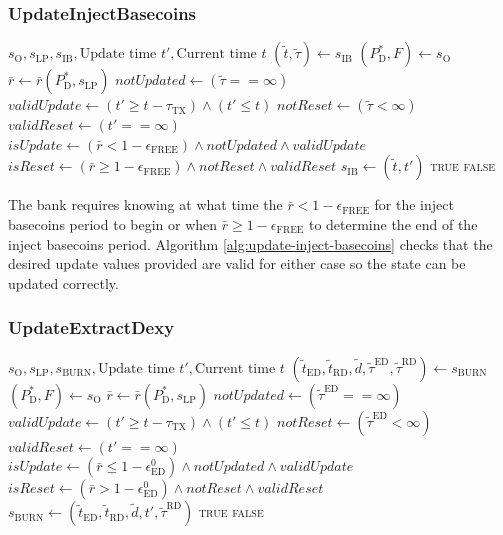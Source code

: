 \documentclass{ifcolog}
\newcommand{\Pdt}{P_{\mathrm{D}}^{*}}
\newcommand{\rr}{\bar{r}}
\newcommand{\slp}{s_{\mathrm{LP}}}
\newcommand{\soracle}{s_{\textrm{O}}}
\newcommand{\sib}{s_{\textrm{IB}}}
\newcommand{\sburn}{s_{\textrm{BURN}}}
\newcommand{\tautx}{\tau_{\textrm{TX}}}
\newcommand{\epsilonfree}{\epsilon_{\textrm{FREE}}}
\newcommand{\epsilondexyzero}{\epsilon_{\textrm{ED}}^{0}}
\begin{document}
\newpage

\subsubsection{UpdateInjectBasecoins}

\begin{algorithm}[H]
\caption{UpdateInjectBasecoins}\label{alg:update-inject-basecoins}
\begin{algorithmic}[1]
\Require $\soracle, \slp, \sib, \textrm{Update time } t', \textrm{Current time } t$
\State $(\tilde{t}, \tilde{\tau}) \gets \sib$
\State $(\Pdt, F) \gets \soracle$
\State $\rr \gets \rr(\Pdt, \slp)$
\State $notUpdated \gets (\tilde{\tau} == \infty)$
\State $validUpdate \gets (t' \ge t - \tautx) \land (t' \le t)$ 
\State $notReset \gets (\tilde{\tau} < \infty)$
\State $validReset \gets (t' == \infty)$
\State $isUpdate \gets (\rr < 1  - \epsilonfree) \land notUpdated \land validUpdate$ 
\State $isReset \gets (\rr \ge 1 - \epsilonfree) \land notReset \land validReset$
  \State $\sib \gets (\tilde{t}, t')$
  \State \Return \textsc{true}
\Else
  \State \Return \textsc{false}
\EndIf
\end{algorithmic}
\end{algorithm}

The bank requires knowing at what time the $\rr < 1 - \epsilonfree$ for the inject basecoins period to begin 
or when $\rr \ge 1 - \epsilonfree$ to determine the end of the inject basecoins period. 
Algorithm \ref{alg:update-inject-basecoins} checks that the desired update values provided are valid for either case so the state 
can be updated correctly.

\newpage

\subsubsection{UpdateExtractDexy}

\begin{algorithm}[H]
\caption{UpdateExtractDexy}\label{alg:update-extract-dexy}
\begin{algorithmic}[1]
\Require $\soracle, \slp, \sburn, \textrm{Update time } t', \textrm{Current time } t$
\State $(\tilde{t}_{\textrm{ED}}, \tilde{t}_{\textrm{RD}}, \tilde{d}, \tilde{\tau}^{\textrm{ED}}, \tilde{\tau}^{\textrm{RD}}) \gets \sburn$
\State $(\Pdt, F) \gets \soracle$ 
\State $\rr \gets \rr(\Pdt, \slp)$
\State $notUpdated \gets (\tilde{\tau}^{\textrm{ED}} == \infty)$
\State $validUpdate \gets (t' \ge t - \tautx) \land (t' \le t)$ 
\State $notReset \gets (\tilde{\tau}^{\textrm{ED}} < \infty)$
\State $validReset \gets (t' == \infty)$
\State $isUpdate \gets (\rr \le 1 - \epsilondexyzero) \land notUpdated \land validUpdate$ 
\State $isReset \gets (\rr > 1 - \epsilondexyzero) \land notReset \land validReset$
  \State $\sburn \gets (\tilde{t}_{\textrm{ED}}, \tilde{t}_{\textrm{RD}}, \tilde{d}, t', \tilde{\tau}^{\textrm{RD}})$
  \State \Return \textsc{true}
\Else
  \State \Return \textsc{false}
\EndIf
\end{algorithmic}
\end{algorithm}
\end{document}
